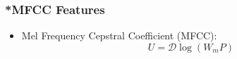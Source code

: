 \begin{frame}
  \frametitle{*MFCC Features}
  \begin{itemize}
    \item Mel Frequency Cepstral Coefficient (MFCC):
    \begin{equation*}
      U = \mathcal{D} \log{ \left( W_m   P \right) }
    \end{equation*}
  \end{itemize}
  \begin{figure}
    \centering
  \end{figure}
\end{frame}


